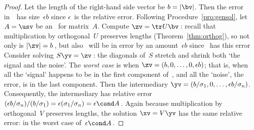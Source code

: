\begin{proof} 
Let the length of the right-hand side vector be \(b=|\bv|\).
Then the error in~\bv\ has size~\(\epsilon b\) since \(\epsilon\)~is the relative error.
Following Procedure~\ref{pro:gensol},
let \(A=\usv\) be an \svd\ for matrix~\(A\).
Compute \(\zv=\tr U\bv\)\,: recall that multiplication by orthogonal~\(U\) preserves lengths (Theorem~\ref{thm:orthog}), so not only is \(|\zv|=b\)\,, but also \zv~will be in error by an amount~\(\epsilon b\) since \bv~has this error 
Consider solving \(S\yv=\zv\)\,: the diagonals of~\(S\) stretch and shrink both `the signal and the noise'.
The \emph{worst case} is when \(\zv=(b,0,\ldots,0,\epsilon b)\); that is, when all the `signal' happens to be in the first component of~\zv, and all the `noise', the error, is in the last component.
Then the intermediary \(\yv=(b/\sigma_1,0,\ldots,\epsilon b/\sigma_n)\).
Consequently, the intermediary has relative error \((\epsilon b/\sigma_n)/(b/\sigma_1)=\epsilon(\sigma_1/\sigma_n)=\epsilon\cond A \)\,.
Again because multiplication by orthogonal~\(V\) preserves lengths, the solution \(\xv=V\yv\) has the same relative error:  in the worst case of~\(\epsilon\cond A\)\,.
\end{proof}

